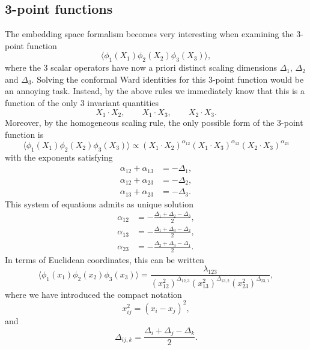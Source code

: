 \documentclass[a4paper,12pt]{article}
\numberwithin{equation}{section}
\begin{document}
\subsection{3-point functions}

The embedding space formalism becomes very interesting when examining the 3-point function
\begin{equation}
	\langle \phi_1(X_1) \phi_2(X_2) \phi_3(X_3) \rangle,
\end{equation}
where the 3 scalar operators have now a priori distinct scaling dimensions $\Delta_1$, $\Delta_2$ and $\Delta_3$.
Solving the conformal Ward identities for this 3-point function would be an annoying task. Instead, by the above rules we immediately know that this is a function of the only 3 invariant quantities 
\begin{equation}
	X_1 \cdot X_2,
	\qquad
	X_1 \cdot X_3,
	\qquad
	X_2 \cdot X_3.
\end{equation}
Moreover, by the homogeneous scaling rule, the only possible form of the 3-point function is
\begin{equation}
	\langle \phi_1(X_1) \phi_2(X_2) \phi_3(X_3) \rangle
	\propto
	(X_1 \cdot X_2)^{\alpha_{12}}
	(X_1 \cdot X_3)^{\alpha_{13}}
	(X_2 \cdot X_3)^{\alpha_{23}}
\end{equation}
with the exponents satisfying 
\begin{align}
	\alpha_{12} + \alpha_{13} &= - \Delta_1,
	\nonumber \\
	\alpha_{12} + \alpha_{23} &= - \Delta_2,
	\\
	\alpha_{13} + \alpha_{23} &= - \Delta_3.
	\nonumber
\end{align}
This system of equations admits as unique solution
\begin{align}
	\alpha_{12} &= - \frac{\Delta_1 + \Delta_2 - \Delta_3}{2},
	\nonumber \\
	\alpha_{13} &= - \frac{\Delta_1 + \Delta_3 - \Delta_2}{2},
	\\
	\alpha_{23} &= - \frac{\Delta_2 + \Delta_3 - \Delta_1}{2}.
\end{align}
In terms of Euclidean coordinates, this can be written
\begin{equation}
	\langle \phi_1(x_1) \phi_2(x_2) \phi_3(x_3) \rangle
	= \frac{\lambda_{123}}
	{(x_{12}^2)^{\Delta_{12,3}}
	(x_{13}^2)^{\Delta_{13,2}}
	(x_{23}^2)^{\Delta_{23,1}}},
	\label{eq:3ptfunction}
\end{equation}
where we have introduced the compact notation
\begin{equation}
	x_{ij}^2 = (x_i - x_j)^2,
\end{equation}
and
\begin{equation}
	\Delta_{ij,k} = \frac{\Delta_i + \Delta_j - \Delta_k}{2}.
\end{equation}
\end{document}
